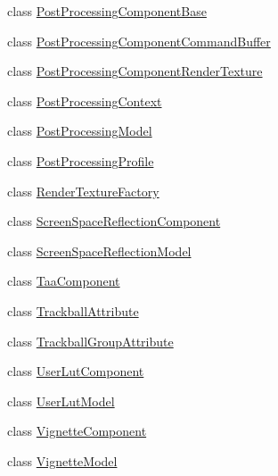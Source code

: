 \begin{DoxyCompactItemize}
\item 
class \hyperlink{class_unity_engine_1_1_post_processing_1_1_post_processing_component_base}{Post\+Processing\+Component\+Base}
\item 
class \hyperlink{class_unity_engine_1_1_post_processing_1_1_post_processing_component_command_buffer}{Post\+Processing\+Component\+Command\+Buffer}
\item 
class \hyperlink{class_unity_engine_1_1_post_processing_1_1_post_processing_component_render_texture}{Post\+Processing\+Component\+Render\+Texture}
\item 
class \hyperlink{class_unity_engine_1_1_post_processing_1_1_post_processing_context}{Post\+Processing\+Context}
\item 
class \hyperlink{class_unity_engine_1_1_post_processing_1_1_post_processing_model}{Post\+Processing\+Model}
\item 
class \hyperlink{class_unity_engine_1_1_post_processing_1_1_post_processing_profile}{Post\+Processing\+Profile}
\item 
class \hyperlink{class_unity_engine_1_1_post_processing_1_1_render_texture_factory}{Render\+Texture\+Factory}
\item 
class \hyperlink{class_unity_engine_1_1_post_processing_1_1_screen_space_reflection_component}{Screen\+Space\+Reflection\+Component}
\item 
class \hyperlink{class_unity_engine_1_1_post_processing_1_1_screen_space_reflection_model}{Screen\+Space\+Reflection\+Model}
\item 
class \hyperlink{class_unity_engine_1_1_post_processing_1_1_taa_component}{Taa\+Component}
\item 
class \hyperlink{class_unity_engine_1_1_post_processing_1_1_trackball_attribute}{Trackball\+Attribute}
\item 
class \hyperlink{class_unity_engine_1_1_post_processing_1_1_trackball_group_attribute}{Trackball\+Group\+Attribute}
\item 
class \hyperlink{class_unity_engine_1_1_post_processing_1_1_user_lut_component}{User\+Lut\+Component}
\item 
class \hyperlink{class_unity_engine_1_1_post_processing_1_1_user_lut_model}{User\+Lut\+Model}
\item 
class \hyperlink{class_unity_engine_1_1_post_processing_1_1_vignette_component}{Vignette\+Component}
\item 
class \hyperlink{class_unity_engine_1_1_post_processing_1_1_vignette_model}{Vignette\+Model}
\end{DoxyCompactItemize}
